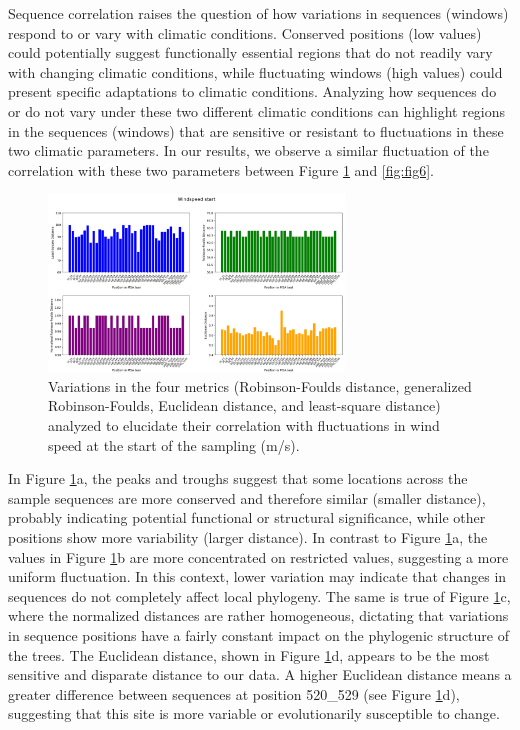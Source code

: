 Sequence correlation raises the question of how variations in sequences (windows) respond to or vary with climatic conditions. Conserved positions (low values) could potentially suggest functionally essential regions that do not readily vary with changing climatic conditions, while fluctuating windows (high values) could present specific adaptations to climatic conditions. Analyzing how sequences do or do not vary under these two different climatic conditions can highlight regions in the sequences (windows) that are sensitive or resistant to fluctuations in these two climatic parameters. In our results, we observe a similar fluctuation of the correlation with these two parameters between Figure \ref{fig:fig5} and \ref{fig:fig6}.

\begin{figure}[]
    \centering
    \includegraphics[width=0.7\textwidth]{figure5.png}
    \caption{Variations in the four metrics (Robinson-Foulds distance, generalized Robinson-Foulds, Euclidean distance, and least-square distance) analyzed to elucidate their correlation with fluctuations in wind speed at the start of the sampling (m/s). \label{fig:fig5}}
\end{figure}

In Figure \ref{fig:fig5}a, the peaks and troughs suggest that some locations across the sample sequences are more conserved and therefore similar (smaller distance), probably indicating potential functional or structural significance, while other positions show more variability (larger distance). In contrast to Figure \ref{fig:fig5}a, the values in Figure \ref{fig:fig5}b are more concentrated on restricted values, suggesting a more uniform fluctuation. In this context, lower variation may indicate that changes in sequences do not completely affect local phylogeny. The same is true of Figure \ref{fig:fig5}c, where the normalized distances are rather homogeneous, dictating that variations in sequence positions have a fairly constant impact on the phylogenic structure of the trees. The Euclidean distance, shown in Figure \ref{fig:fig5}d, appears to be the most sensitive and disparate distance to our data. A higher Euclidean distance means a greater difference between sequences at position 520_529 (see Figure \ref{fig:fig5}d), suggesting that this site is more variable or evolutionarily susceptible to change. 


